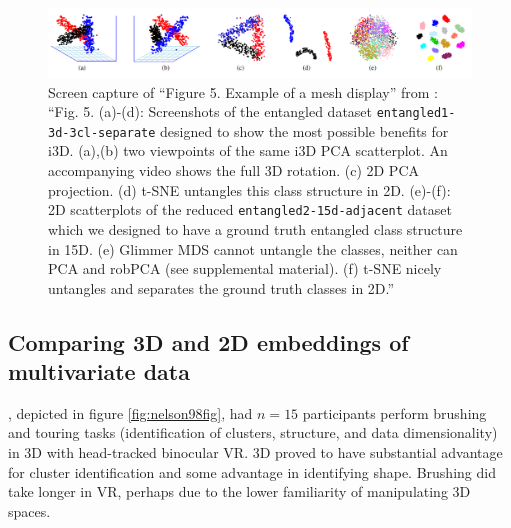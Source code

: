 \documentclass{monashthesis}
\begin{document}
\begin{figure}

{\centering \includegraphics[width=1\linewidth]{./figures/sedlmair13fig} 

}

\caption{Screen capture of ``Figure 5. Example of a mesh
display'' from \textcite{sedlmair_empirical_2013}: ``Fig. 5. (a)-(d):
Screenshots of the entangled dataset \texttt{entangled1-3d-3cl-separate}
designed to show the most possible benefits for i3D. (a),(b) two
viewpoints of the same i3D PCA scatterplot. An accompanying video shows
the full 3D rotation. (c) 2D PCA projection. (d) t-SNE untangles this
class structure in 2D. (e)-(f): 2D scatterplots of the reduced
\texttt{entangled2-15d-adjacent} dataset which we designed to have a
ground truth entangled class structure in 15D. (e) Glimmer MDS cannot
untangle the classes, neither can PCA and robPCA (see supplemental
material). (f) t-SNE nicely untangles and separates the ground truth
classes in 2D.''}\label{fig:sedlmair13fig}
\end{figure}

\subsection{Comparing 3D and 2D embeddings of multivariate
data}\label{comparing-3d-and-2d-embeddings-of-multivariate-data}

\textcite{nelson_xgobi_1998}, depicted in figure \ref{fig:nelson98fig},
had \(n=15\) participants perform brushing and touring tasks
(identification of clusters, structure, and data dimensionality) in 3D
with head-tracked binocular VR. 3D proved to have substantial advantage
for cluster identification and some advantage in identifying shape.
Brushing did take longer in VR, perhaps due to the lower familiarity of
manipulating 3D spaces.
\end{document}
